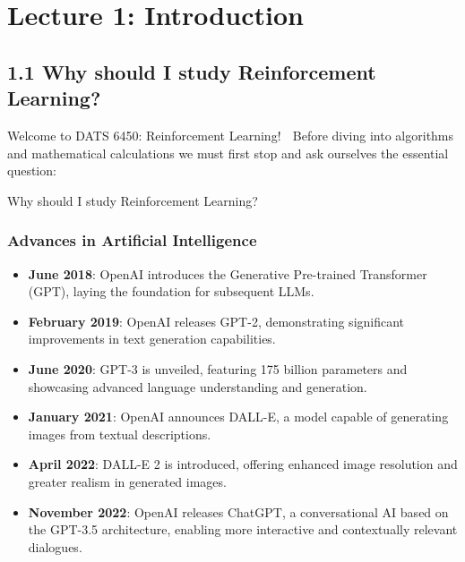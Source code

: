 \documentclass[
  letterpaper,
  DIV=11,
  numbers=noendperiod]{scrreprt}
\begin{document}
\part{Lecture 1: Introduction}

\chapter{1.1 Why should I study Reinforcement
Learning?}\label{why-should-i-study-reinforcement-learning}

\begin{tcolorbox}[enhanced jigsaw, colback=white, left=2mm, breakable, opacityback=0, bottomrule=.15mm, rightrule=.15mm, arc=.35mm, colframe=quarto-callout-note-color-frame, leftrule=.75mm, toprule=.15mm]

Welcome to DATS 6450: Reinforcement Learning! 🚀 Before diving into
algorithms and mathematical calculations we must first stop and ask
ourselves the essential question:

Why should I study Reinforcement Learning? 🤔

\end{tcolorbox}

\section{Advances in Artificial
Intelligence}\label{advances-in-artificial-intelligence}

\begin{itemize}
\item
  \textbf{June 2018}: OpenAI introduces the Generative Pre-trained
  Transformer (GPT), laying the foundation for subsequent LLMs.
\item
  \textbf{February 2019}: OpenAI releases GPT-2, demonstrating
  significant improvements in text generation capabilities.
\item
  \textbf{June 2020}: GPT-3 is unveiled, featuring 175 billion
  parameters and showcasing advanced language understanding and
  generation.
\item
  \textbf{January 2021}: OpenAI announces DALL-E, a model capable of
  generating images from textual descriptions.
\item
  \textbf{April 2022}: DALL-E 2 is introduced, offering enhanced image
  resolution and greater realism in generated images.
\item
  \textbf{November 2022}: OpenAI releases ChatGPT, a conversational AI
  based on the GPT-3.5 architecture, enabling more interactive and
  contextually relevant dialogues.
\end{itemize}
\end{document}
